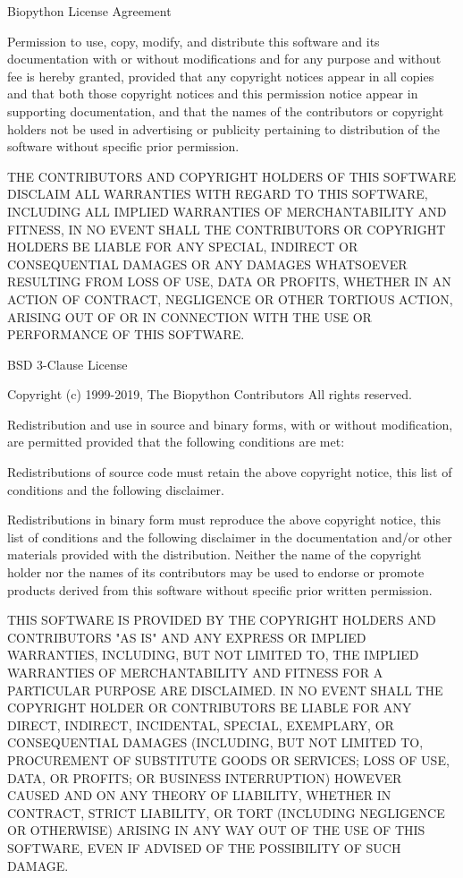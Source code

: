 Biopython License Agreement

Permission to use, copy, modify, and distribute this software and its documentation with or without modifications and for any purpose and without fee is hereby granted, provided that any copyright notices appear in all copies and that both those copyright notices and this permission notice appear in supporting documentation, and that the names of the contributors or copyright holders not be used in advertising or publicity pertaining to distribution of the software without specific prior permission.

THE CONTRIBUTORS AND COPYRIGHT HOLDERS OF THIS SOFTWARE DISCLAIM ALL WARRANTIES WITH REGARD TO THIS SOFTWARE, INCLUDING ALL IMPLIED WARRANTIES OF MERCHANTABILITY AND FITNESS, IN NO EVENT SHALL THE CONTRIBUTORS OR COPYRIGHT HOLDERS BE LIABLE FOR ANY SPECIAL, INDIRECT OR CONSEQUENTIAL DAMAGES OR ANY DAMAGES WHATSOEVER RESULTING FROM LOSS OF USE, DATA OR PROFITS, WHETHER IN AN ACTION OF CONTRACT, NEGLIGENCE OR OTHER TORTIOUS ACTION, ARISING OUT OF OR IN CONNECTION WITH THE USE OR PERFORMANCE OF THIS SOFTWARE.

BSD 3-Clause License

Copyright (c) 1999-2019, The Biopython Contributors All rights reserved.

Redistribution and use in source and binary forms, with or without modification, are permitted provided that the following conditions are met:

Redistributions of source code must retain the above copyright notice, this list of conditions and the following disclaimer.

Redistributions in binary form must reproduce the above copyright notice, this list of conditions and the following disclaimer in the documentation and/or other materials provided with the distribution.
Neither the name of the copyright holder nor the names of its contributors may be used to endorse or promote products derived from this software without specific prior written permission.

THIS SOFTWARE IS PROVIDED BY THE COPYRIGHT HOLDERS AND CONTRIBUTORS "AS IS" AND ANY EXPRESS OR IMPLIED WARRANTIES, INCLUDING, BUT NOT LIMITED TO, THE IMPLIED WARRANTIES OF MERCHANTABILITY AND FITNESS FOR A PARTICULAR PURPOSE ARE DISCLAIMED. IN NO EVENT SHALL THE COPYRIGHT HOLDER OR CONTRIBUTORS BE LIABLE FOR ANY DIRECT, INDIRECT, INCIDENTAL, SPECIAL, EXEMPLARY, OR CONSEQUENTIAL DAMAGES (INCLUDING, BUT NOT LIMITED TO, PROCUREMENT OF SUBSTITUTE GOODS OR SERVICES; LOSS OF USE, DATA, OR PROFITS; OR BUSINESS INTERRUPTION) HOWEVER CAUSED AND ON ANY THEORY OF LIABILITY, WHETHER IN CONTRACT, STRICT LIABILITY, OR TORT (INCLUDING NEGLIGENCE OR OTHERWISE) ARISING IN ANY WAY OUT OF THE USE OF THIS SOFTWARE, EVEN IF ADVISED OF THE POSSIBILITY OF SUCH DAMAGE.

